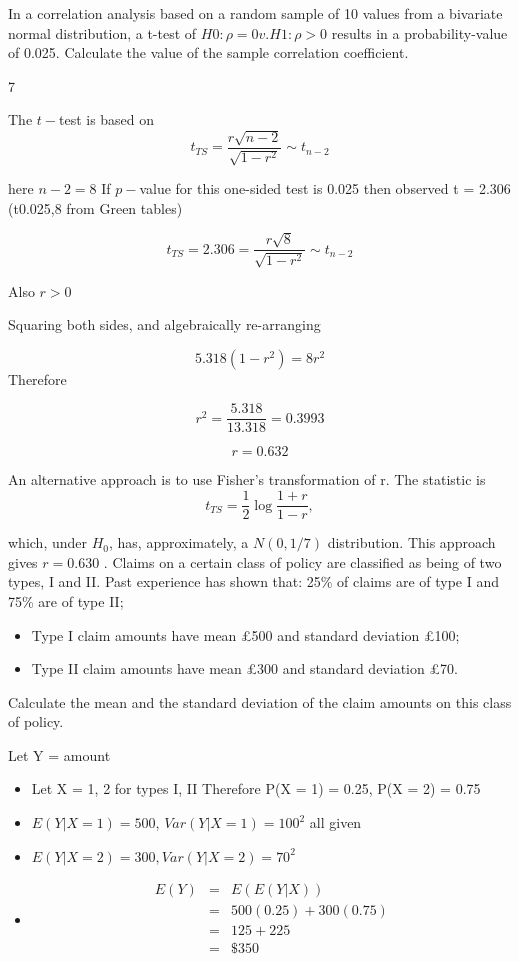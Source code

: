 \documentclass[a4paper,12pt]{article}
\begin{document}
In a correlation analysis based on a random sample of 10 values from a bivariate
normal distribution, a t-test of
$H0 : \rho = 0 v. H1 : \rho > 0$
results in a probability-value of 0.025.
Calculate the value of the sample correlation coefficient. 
\newpage


7 


The $t-$test is based on
\[ t_{TS} = \frac{r\sqrt{n-2}}{\sqrt{1-r^2}} \sim t_{n-2}\]

here $n − 2 = 8$
If $p-$value for this one-sided test is 0.025 then observed t = 2.306 (t0.025,8 from
Green tables)


\[ t_{TS} = 2.306 = \frac{r\sqrt{8}}{\sqrt{1-r^2}} \sim t_{n-2}\]

Also  $r > 0$

Squaring both sides, and algebraically re-arranging

\[5.318 (1 − r^2) = 8r^2\]
Therefore

\[r^2 = \frac{5.318}{13.318}=  0.3993\]

\[r = 0.632\]




An alternative approach is to use Fisher’s transformation of r. The
statistic is
\[ t_{TS} = \frac{1}{2} \log \frac{1+r}{1-r}, \]

which, under $H_0$, has, approximately, a $N(0,1/7)$ distribution.
This approach gives $r = 0.630$ .
\newpage Claims on a certain class of policy are classified as being of two types, I and II.
Past experience has shown that:
25\% of claims are of type I and 75\% are of type II;
\begin{itemize}
    \item Type I claim amounts have mean £500 and standard deviation £100;
\item Type II claim amounts have mean £300 and standard deviation £70.
\end{itemize}

Calculate the mean and the standard deviation of the claim amounts on this
class of policy. 
\newpage 

Let Y = amount
\begin{itemize}
    \item Let X = 1, 2 for types I, II
Therefore P(X = 1) = 0.25, P(X = 2) = 0.75
\item $E(Y|X = 1) = 500$, $Var(Y|X = 1) = 100^2$
all given
\item $E(Y|X = 2) = 300, Var(Y|X = 2) = 70^2$
\item \begin{eqnarray*}
E(Y) &=& E(E(Y|X)) \\ &=& 500(0.25) + 300(0.75)\\
&=& 125 + 225 \\ &=& \$350\\
\end{eqnarray*}
\end{itemize}
\end{document}
